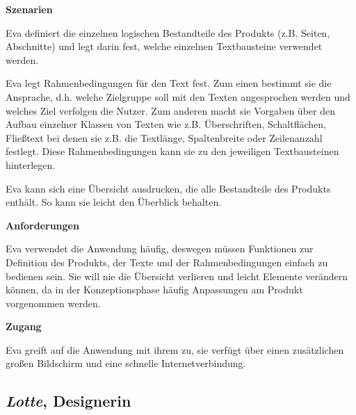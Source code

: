 \begin{multicols}{2}
\columnbreak

\textbf{Szenarien}

Eva definiert die einzelnen logischen Bestandteile des Produkts (z.B. Seiten, Abschnitte) und legt darin fest, welche einzelnen Textbausteine verwendet werden.

Eva legt Rahmenbedingungen für den Text fest. Zum einen bestimmt sie die Ansprache, d.h. welche Zielgruppe soll mit den Texten angesprochen werden und welches Ziel verfolgen die Nutzer. Zum anderen macht sie Vorgaben über den Aufbau einzelner Klassen von Texten wie z.B. Überschriften, Schaltflächen, Fließtext bei denen sie z.B. die Textlänge, Spaltenbreite oder Zeilenanzahl festlegt. Diese Rahmenbedingungen kann sie zu den jeweiligen Textbausteinen hinterlegen.

Eva kann sich eine Übersicht ausdrucken, die alle Bestandteile des Produkts enthält. So kann sie leicht den Überblick behalten.

\textbf{Anforderungen}

Eva verwendet die Anwendung häufig, deswegen müssen Funktionen zur Definition des Produkts, der Texte und der Rahmenbedingungen einfach zu bedienen sein. Sie will nie die Übersicht verlieren und leicht Elemente verändern können, da in der Konzeptionsphase häufig Anpassungen am Produkt vorgenommen werden. 

\textbf{Zugang}

Eva greift auf die Anwendung mit ihrem  zu, sie verfügt über einen zusätzlichen großen Bildschirm und eine schnelle Internetverbindung.

\end{multicols}

\pagebreak

\subsection{\emph{Lotte}, Designerin}\label{p:lotte}

